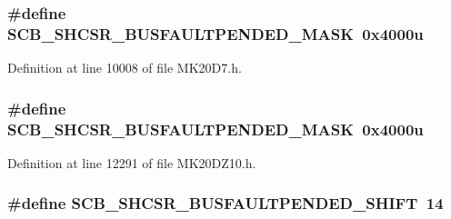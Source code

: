 \subsubsection[{\texorpdfstring{S\+C\+B\+\_\+\+S\+H\+C\+S\+R\+\_\+\+B\+U\+S\+F\+A\+U\+L\+T\+P\+E\+N\+D\+E\+D\+\_\+\+M\+A\+SK}{SCB_SHCSR_BUSFAULTPENDED_MASK}}]{\setlength{\rightskip}{0pt plus 5cm}\#define S\+C\+B\+\_\+\+S\+H\+C\+S\+R\+\_\+\+B\+U\+S\+F\+A\+U\+L\+T\+P\+E\+N\+D\+E\+D\+\_\+\+M\+A\+SK~0x4000u}\hypertarget{group___s_c_b___register___masks_ga196485bcd4473212a57a4449f0738ae5}{}\label{group___s_c_b___register___masks_ga196485bcd4473212a57a4449f0738ae5}


Definition at line 10008 of file M\+K20\+D7.\+h.

\subsubsection[{\texorpdfstring{S\+C\+B\+\_\+\+S\+H\+C\+S\+R\+\_\+\+B\+U\+S\+F\+A\+U\+L\+T\+P\+E\+N\+D\+E\+D\+\_\+\+M\+A\+SK}{SCB_SHCSR_BUSFAULTPENDED_MASK}}]{\setlength{\rightskip}{0pt plus 5cm}\#define S\+C\+B\+\_\+\+S\+H\+C\+S\+R\+\_\+\+B\+U\+S\+F\+A\+U\+L\+T\+P\+E\+N\+D\+E\+D\+\_\+\+M\+A\+SK~0x4000u}\hypertarget{group___s_c_b___register___masks_ga196485bcd4473212a57a4449f0738ae5}{}\label{group___s_c_b___register___masks_ga196485bcd4473212a57a4449f0738ae5}


Definition at line 12291 of file M\+K20\+D\+Z10.\+h.

\subsubsection[{\texorpdfstring{S\+C\+B\+\_\+\+S\+H\+C\+S\+R\+\_\+\+B\+U\+S\+F\+A\+U\+L\+T\+P\+E\+N\+D\+E\+D\+\_\+\+S\+H\+I\+FT}{SCB_SHCSR_BUSFAULTPENDED_SHIFT}}]{\setlength{\rightskip}{0pt plus 5cm}\#define S\+C\+B\+\_\+\+S\+H\+C\+S\+R\+\_\+\+B\+U\+S\+F\+A\+U\+L\+T\+P\+E\+N\+D\+E\+D\+\_\+\+S\+H\+I\+FT~14}\hypertarget{group___s_c_b___register___masks_ga5578c153c1fbc6c326af0ff1e197ef3a}{}\label{group___s_c_b___register___masks_ga5578c153c1fbc6c326af0ff1e197ef3a}



